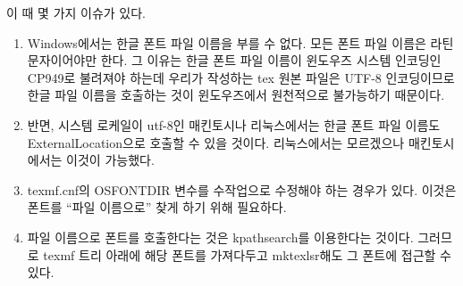 \documentclass[
	12pt,
	a4paper,
	kosection,
	footnote,
	microtype,
	figtabcapt,
]{oblivoir}
\def\myLabel#1#2{\label{#1}}
\def\myLabel#1#2{\label{#2}}
\begin{document}
이 때 몇 가지 이슈가 있다.
\begin{enumerate}[(가)]\tightlist
\item Windows에서는 한글 폰트 파일 이름을 부를 수 없다. 모든 폰트 파일 이름은
라틴 문자이어야만 한다. 그 이유는 한글 폰트 파일 이름이 윈도우즈 시스템 인코딩인
CP949로 불려져야 하는데 우리가 작성하는 tex 원본 파일은 UTF-8 인코딩이므로
한글 파일 이름을 호출하는 것이 윈도우즈에서 원천적으로 불가능하기 때문이다.

\item 반면, 시스템 로케일이 utf-8인 매킨토시나 리눅스에서는 한글 폰트 파일 이름도
ExternalLocation으로 호출할 수 있을 것이다. 리눅스에서는 모르겠으나 매킨토시에서는
이것이 가능했다.

\item texmf.cnf의 OSFONTDIR 변수를 수작업으로 수정해야 하는 경우가 있다. 
이것은 폰트를 ``파일 이름으로'' 찾게 하기 위해 필요하다.

\item 파일 이름으로 폰트를 호출한다는 것은 kpathsearch를 이용한다는
것이다. 그러므로 texmf 트리 아래에 해당 폰트를 가져다두고 mktexlsr해도 그
폰트에 접근할 수 있다.

\end{enumerate}


\end{document}
